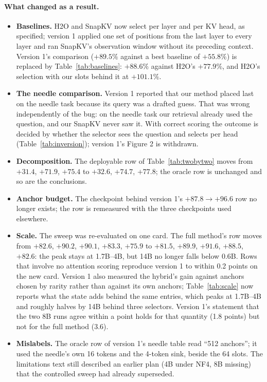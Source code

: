 \documentclass[11pt]{article}
\begin{document}
\paragraph{What changed as a result.}
\begin{itemize}
\item \textbf{Baselines.} H2O and SnapKV now select per layer and per KV head, as
specified; version 1 applied one set of positions from the last layer to every
layer and ran SnapKV's observation window without its preceding context. Version
1's comparison ($+89.5\%$ against a best baseline of $+55.8\%$) is replaced by
Table~\ref{tab:baselines}: $+88.6\%$ against H2O's $+77.9\%$, and H2O's selection
with our slots behind it at $+101.1\%$.
\item \textbf{The needle comparison.} Version 1 reported that our method placed
last on the needle task because its query was a drafted guess. That was wrong
independently of the bug: on the needle task our retrieval already used the
question, and our SnapKV never saw it. With correct scoring the outcome is
decided by whether the selector sees the question and selects per head
(Table~\ref{tab:inversion}); version 1's Figure 2 is withdrawn.
\item \textbf{Decomposition.} The deployable row of Table~\ref{tab:twobytwo}
moves from $+31.4$, $+71.9$, $+75.4$ to $+32.6$, $+74.7$, $+77.8$; the oracle row is
unchanged and so are the conclusions.
\item \textbf{Anchor budget.} The checkpoint behind version 1's
$+87.8\to+96.6$ row no longer exists; the row is remeasured with the three
checkpoints used elsewhere.
\item \textbf{Scale.} The sweep was re-evaluated on one card. The full
method's row moves from $+82.6$, $+90.2$, $+90.1$, $+83.3$, $+75.9$ to $+81.5$,
$+89.9$, $+91.6$, $+88.5$, $+82.6$: the peak stays at 1.7B--4B, but 14B no longer
falls below 0.6B. Rows that involve no attention scoring reproduce version 1 to
within 0.2 points on the new card. Version 1 also measured the hybrid's gain against anchors
chosen by rarity rather than against its own anchors; Table~\ref{tab:scale} now
reports what the state adds behind the same entries, which peaks at 1.7B--4B and
roughly halves by 14B behind three selectors. Version 1's statement that the two
8B runs agree within a point holds for that quantity (1.8 points) but not for
the full method (3.6).
\item \textbf{Mislabels.} The oracle row of version 1's needle table read ``512
anchors''; it used the needle's own 16 tokens and the 4-token sink, beside the 64
slots. The limitations text still described an earlier plan (4B under NF4, 8B
missing) that the controlled sweep had already superseded.
\end{itemize}
\end{document}
